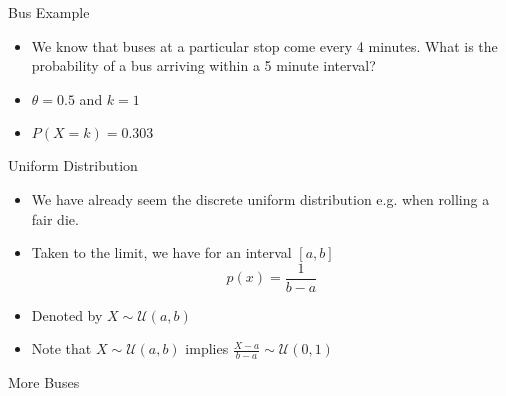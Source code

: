 \documentclass{beamer}
\begin{document}
\begin{frame}{Bus Example}  
\begin{itemize} 
 \item We know that buses at a particular stop come every 4 minutes. What is the probability of a bus arriving within a 5 minute interval?
 \item $\theta = 0.5$ and $k = 1$ 
 \item $P(X = k) = 0.303$ 
\end{itemize}
\end{frame}

\begin{frame}{Uniform Distribution}  
 \begin{itemize} 
  \item We have already seem the discrete uniform distribution e.g. when rolling a fair die. 
\item Taken to the limit, we have for an interval $[a, b]$ 
\begin{displaymath} 
 p(x) = \frac{1}{b-a}
\end{displaymath}
\item Denoted by $X \sim \mathcal{U}(a, b)$
\item Note that  $X \sim \mathcal{U}(a, b)$ implies $\frac{X - a}{b - a} \sim \mathcal{U}(0, 1)$
\end{itemize}
\end{frame}

\begin{frame}{More Buses} 
 
\end{frame}
\end{document}
